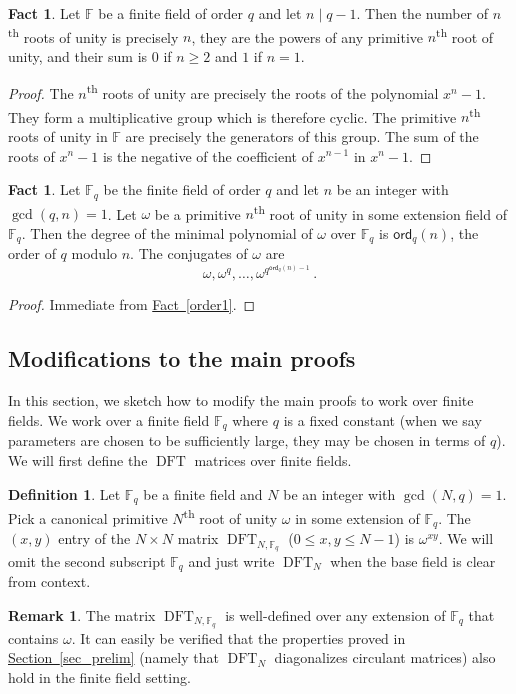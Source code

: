 \documentclass[11pt]{article}
\numberwithin{equation}{section}
\theoremstyle{definition}
\newtheorem{definition}[theorem]{Definition}
\newtheorem{remark}[theorem]{Remark}
\theoremstyle{plain}
\newcommand{\expref}[2]{\hyperref[#2]{#1~\ref{#2}}}
\theoremstyle{definition}
\newtheorem{fact.}[theorem]{Fact}
\newcommand\F{{\mathbb{F}}}
\newcommand\ord{\textsf{ord}}
\newcommand{\ts}{\textsuperscript}
\DeclareMathOperator{\DFT}{DFT}
\begin{document}
\begin{fact.}   \label{sumofroots}
Let $\F$ be a finite field of order $q$ and let $n\mid q-1$.
Then the number of $n$\ts{th} roots of unity is precisely $n$,
they are the powers of any primitive $n$\ts{th} root of unity,
and their sum is $0$ if $n\ge 2$ and $1$ if $n=1$.
\end{fact.}
\begin{proof}
The $n$\ts{th} roots of unity are precisely the roots of
the polynomial $x^n-1$.  They form a multiplicative group
which is therefore cyclic.  The primitive $n$\ts{th} roots
of unity in $\F$ are precisely the generators of this group.
The sum of the roots of $x^n-1$ is the negative of the
coefficient of $x^{n-1}$ in $x^n-1$.
\end{proof}
 
\begin{fact.}\label{order}
Let $\F_q$ be the finite field of order $q$ 
and let $n$ be an integer with $\gcd(q,n) = 1$.  
Let $\omega$ be a primitive $n$\ts{th} root of unity
in some extension field of $\F_q$.
Then the degree of the minimal polynomial of $\omega$ over
$\F_q$ is $\ord_q(n)$, the order of $q$ modulo $n$.
The conjugates of $\omega$ are
\[
\omega, \omega^q, \dots , \omega^{q^{\ord_q(n)-1}} \,.
\]
\end{fact.}
\begin{proof}
Immediate from \expref{Fact}{order1}.
\end{proof}

\subsection{Modifications to the main proofs}
In this section, we sketch how to modify the main proofs to work over finite fields.  We work over a finite field $\F_q$ where $q$ is a fixed constant (when we say parameters are chosen to be sufficiently large, they may be chosen in terms of $q$).  We will first define the $\DFT$ matrices over finite fields.
\begin{definition}
Let $\F_q$ be a finite field and $N$ be an integer with $\gcd(N,q) = 1$.  Pick a canonical primitive $N$\ts{th} root of unity $\omega$ in some extension of $\F_q$.  The $(x,y)$ entry of the $N \times N$ matrix $\DFT_{N,\F_q}$ ($0 \leq x,y \leq N - 1$) is $\omega^{xy}$.  We will omit the second subscript $\F_q$ and just write $\DFT_N$ when the base field is clear from context.
\end{definition}
\begin{remark}\label{finitefield_basicprops}
The matrix $\DFT_{N, \F_q}$ is well-defined over any extension of $\F_q$ that contains $\omega$.  It can easily be verified that the properties proved in \expref{Section}{sec_prelim} (namely that $\DFT_N$ diagonalizes circulant matrices) also hold in the finite field setting.
\end{remark}
\end{document}
